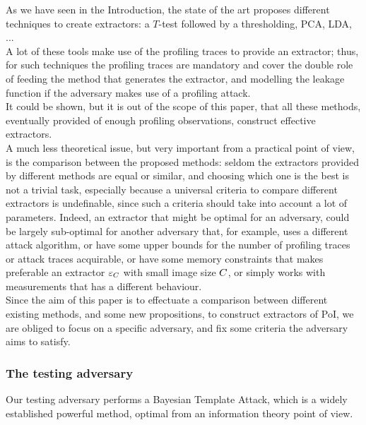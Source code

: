 As we have seen in the Introduction, the state of the art proposes different techniques to create extractors:  a $T$-test followed by a thresholding, PCA, LDA, ...\\
A lot of these tools make use of the profiling traces to provide an extractor; thus, for such techniques the profiling traces are mandatory and cover the double role of feeding the method that generates the extractor, and modelling the leakage function if the adversary makes use of a profiling attack.\\
It could be shown, but it is out of the scope of this paper, that all these methods, eventually provided of enough profiling observations, construct effective extractors.\\
A much less theoretical issue, but very important from a practical point of view, is the comparison between the proposed methods: seldom the extractors provided by different methods are equal or similar, and choosing which one is the best is not a trivial task, especially because a universal criteria to compare different extractors is undefinable, since such a criteria should take into account a lot of parameters. Indeed, an extractor that might be optimal for an adversary, could be largely sub-optimal for another adversary that, for example, uses a different attack algorithm, or have some upper bounds for the number of profiling traces or attack traces acquirable, or have some memory constraints that makes preferable an extractor $\varepsilon_C$ with small image size $C$, or simply works with measurements that has a different behaviour. \\
Since the aim of this paper is to effectuate a comparison between different existing methods, and some new propositions, to construct extractors of PoI, we are obliged to focus on a specific adversary, and fix some criteria the adversary aims to satisfy. 
\subsubsection{The testing adversary} Our testing adversary performs a Bayesian Template Attack, which is a widely established powerful method, optimal from an information theory point of view. 


